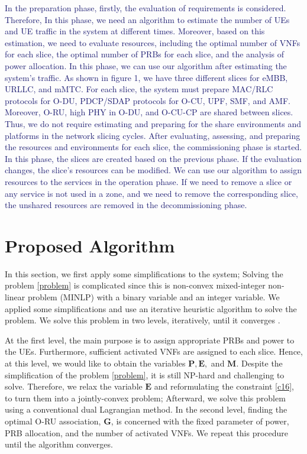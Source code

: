 \documentclass[lettersize,journal]{IEEEtran}
\begin{document}
\textcolor{MidnightBlue}{In the preparation phase, firstly, the evaluation of requirements is considered. Therefore, In this phase, we need an algorithm to estimate the number of UEs and UE traffic in the system at different times. Moreover, based on this estimation, we need to evaluate resources, including the optimal number of VNFs for each slice, the optimal number of PRBs for each slice, and the analysis of power allocation. In this phase, we can use our algorithm after estimating the system's traffic.
As shown in figure 1, we have three different slices for eMBB, URLLC, and mMTC. For each slice, the system must prepare MAC/RLC protocols for O-DU, PDCP/SDAP protocols for O-CU, UPF, SMF, and AMF. Moreover, O-RU, high PHY in O-DU, and O-CU-CP are shared between slices. Thus, we do not require estimating and preparing for the share environments and platforms in the network slicing cycles.  
After evaluating, assessing, and preparing the resources and environments for each slice, the commissioning phase is started. In this phase, the slices are created based on the previous phase. If the evaluation changes, the slice's resources can be modified.
We can use our algorithm to assign resources to the services in the operation phase.
If we need to remove a slice or any service is not used in a zone, and we need to remove the corresponding slice, the unshared resources are removed in the decommissioning phase.}
\section{Proposed Algorithm}\label{proAlg}
In this section, we first apply some simplifications to the system; Solving the problem \eqref{problem} is complicated since this is non-convex mixed-integer non-linear problem (MINLP) with a binary variable and an integer variable.
We applied some simplifications and use an iterative heuristic algorithm to solve the problem.
We solve this problem in two levels, iteratively, until it converges \cite{ali2018joint}.

At the first level, the main purpose is to assign appropriate PRBs and power to the UEs. Furthermore, sufficient activated VNFs are assigned to each slice. Hence, at this level, we would like to obtain the variables $\boldsymbol{P}, \boldsymbol{E},$ and $\boldsymbol{M}$.
Despite the simplification of the problem
\eqref{problem}, it is still NP-hard and challenging to solve. Therefore,
we relax the variable $\boldsymbol{E}$ \cite{lee2018dynamic,ali2018joint} and reformulating the constraint \eqref{c16},
to turn them into a jointly-convex problem; Afterward, we solve this problem using a conventional dual Lagrangian method.
In the second level, finding the optimal O-RU association, $ \boldsymbol{G}$, is concerned with the fixed parameter of power, PRB allocation, and the number of activated VNFs.
We repeat this procedure until the algorithm converges.
\end{document}
